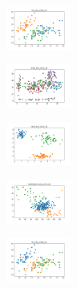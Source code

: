 \begin{figure}[H]
\begin{subfigure}
    \end{subfigure}
    \hfill
    \begin{subfigure}
        \centering
        \includegraphics[width=0.234\textwidth]{img/aggsf/iris_set_const_10_589741062_clust.png}
    \end{subfigure}
    \hfill
    \begin{subfigure}
        \centering
        \includegraphics[width=0.234\textwidth]{img/aggsf/ecoli_set_const_10_589741062_clust.png}
    \end{subfigure}
    \hfill
    \begin{subfigure}
        \centering
        \includegraphics[width=0.234\textwidth]{img/aggsf/rand_set_const_10_589741062_clust.png}
    \end{subfigure}
    \hfill
    \begin{subfigure}
        \centering
        \includegraphics[width=0.234\textwidth]{img/aggsf/newthyroid_set_const_10_589741062_clust.png}
    \end{subfigure}
    \hfill
    \begin{subfigure}
        \centering
        \includegraphics[width=0.234\textwidth]{img/aggsf/iris_set_const_10_277451237_clust.png}
    \end{subfigure}
    \hfill

\end{figure}
